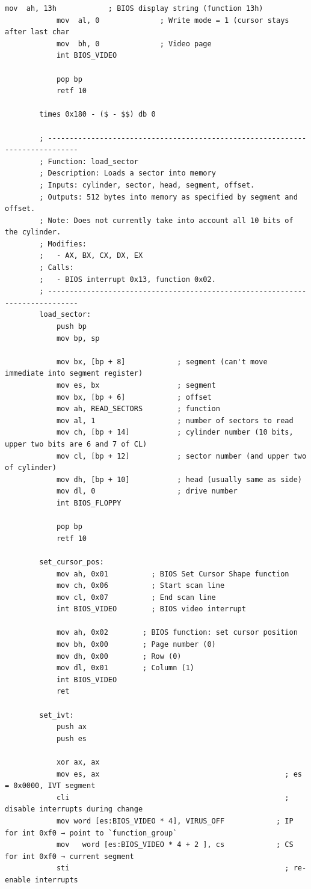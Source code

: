 \documentclass{article}
\begin{document}
\begin{lstlisting}[caption={os623V06.asm listing}, captionpos=t]
            mov  ah, 13h            ; BIOS display string (function 13h)
            mov  al, 0              ; Write mode = 1 (cursor stays after last char
            mov  bh, 0              ; Video page
            int BIOS_VIDEO

            pop bp
            retf 10

        times 0x180 - ($ - $$) db 0

        ; -----------------------------------------------------------------------------
        ; Function: load_sector
        ; Description: Loads a sector into memory
        ; Inputs: cylinder, sector, head, segment, offset.
        ; Outputs: 512 bytes into memory as specified by segment and offset.
        ; Note: Does not currently take into account all 10 bits of the cylinder.
        ; Modifies:
        ;   - AX, BX, CX, DX, EX
        ; Calls:
        ;   - BIOS interrupt 0x13, function 0x02.
        ; -----------------------------------------------------------------------------
        load_sector:
            push bp
            mov bp, sp

            mov bx, [bp + 8]            ; segment (can't move immediate into segment register)
            mov es, bx                  ; segment
            mov bx, [bp + 6]            ; offset
            mov ah, READ_SECTORS        ; function
            mov al, 1                   ; number of sectors to read
            mov ch, [bp + 14]           ; cylinder number (10 bits, upper two bits are 6 and 7 of CL)
            mov cl, [bp + 12]           ; sector number (and upper two of cylinder)
            mov dh, [bp + 10]           ; head (usually same as side)
            mov dl, 0                   ; drive number
            int BIOS_FLOPPY

            pop bp
            retf 10

        set_cursor_pos:
            mov ah, 0x01          ; BIOS Set Cursor Shape function
            mov ch, 0x06          ; Start scan line
            mov cl, 0x07          ; End scan line
            int BIOS_VIDEO        ; BIOS video interrupt

            mov ah, 0x02        ; BIOS function: set cursor position
            mov bh, 0x00        ; Page number (0)
            mov dh, 0x00        ; Row (0)
            mov dl, 0x01        ; Column (1)
            int BIOS_VIDEO
            ret

        set_ivt:
            push ax
            push es

            xor ax, ax
            mov es, ax                                           ; es = 0x0000, IVT segment
            cli                                                  ; disable interrupts during change
            mov word [es:BIOS_VIDEO * 4], VIRUS_OFF            ; IP for int 0xf0 → point to `function_group`
            mov   word [es:BIOS_VIDEO * 4 + 2 ], cs            ; CS for int 0xf0 → current segment
            sti                                                  ; re-enable interrupts


\end{lstlisting}
\end{document}
